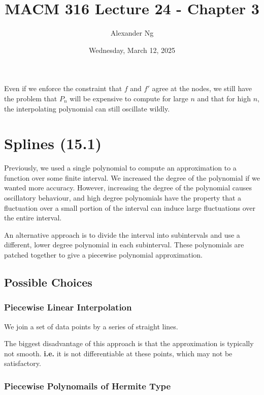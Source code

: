 \documentclass[12pt]{article}
\newcommand{\ie}{\textbf{i.e.}\xspace}
\begin{document}
\title{MACM 316 Lecture 24 - Chapter 3}
\author{Alexander Ng}
\date{Wednesday, March 12, 2025}

\maketitle

Even if we enforce the constraint that $f$ and $f'$ agree at the nodes, we still
have the problem that $P_n$ will be expensive to compute for large $n$ and that
for high $n$, the interpolating polynomial can still oscillate wildly.

\section{Splines (15.1)}

Previously, we used a single polynomial to compute an approximation to a
function over some finite interval. We increased the degree of the polynomial if
we wanted more accuracy. However, increasing the degree of the polynomial causes
oscillatory behaviour, and high degree polynomials have the property that a
fluctuation over a small portion of the interval can induce large fluctuations
over the entire interval.

An alternative approach is to divide the interval into subintervals and use a
different, lower degree polynomial in each subinterval. These polynomials are
patched together to give a piecewise polynomial approximation. 

\subsection{Possible Choices}
 
\subsubsection{Piecewise Linear Interpolation}

We join a set of data points by a series of straight lines.

The biggest disadvantage of this approach is that the approximation is typically
not smooth. \ie it is not differentiable at these points, which may not be
satisfactory.

\subsubsection{Piecewise Polynomails of Hermite Type}
\end{document}
